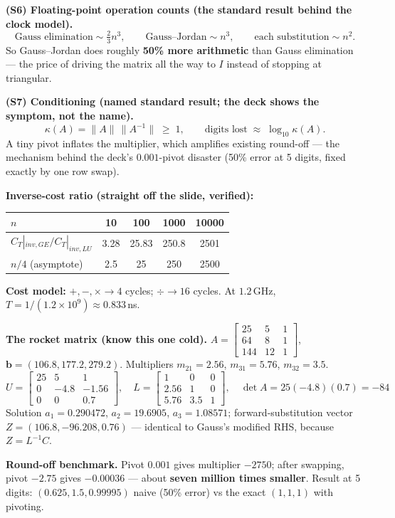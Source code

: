 \begin{derivedbox}
\smallskip
\textbf{(S6) Floating-point operation counts (the standard result behind the clock model).}
\[
\text{Gauss elimination} \sim \tfrac23 n^3, \qquad \text{Gauss--Jordan} \sim n^3, \qquad \text{each substitution} \sim n^2 .
\]
So Gauss--Jordan does roughly \textbf{50\% more arithmetic} than Gauss elimination --- the price of driving the matrix all the way to $I$ instead of stopping at triangular.

\smallskip
\textbf{(S7) Conditioning (named standard result; the deck shows the symptom, not the name).}
\[
\kappa(A) = \|A\|\,\|A^{-1}\| \;\ge\; 1, \qquad \text{digits lost} \;\approx\; \log_{10}\kappa(A).
\]
A tiny pivot inflates the multiplier, which amplifies existing round-off --- the mechanism behind the deck's $0.001$-pivot disaster (50\% error at 5 digits, fixed exactly by one row swap).
\end{derivedbox}

\begin{numbox}
\textbf{Inverse-cost ratio (straight off the slide, verified):}
\begin{center}\small
\begin{tabular}{@{}lcccc@{}}
\toprule
$n$ & 10 & 100 & 1000 & 10000\\
\midrule
$C_T|_{inv,GE} / C_T|_{inv,LU}$ & 3.28 & 25.83 & 250.8 & 2501\\
$n/4$ (asymptote) & 2.5 & 25 & 250 & 2500\\
\bottomrule
\end{tabular}
\end{center}

\textbf{Cost model:} $+,-,\times \to 4$ cycles; $\div \to 16$ cycles. At $1.2$\,GHz, $T = 1/(1.2\times10^9) \approx 0.833$\,ns.

\smallskip
\textbf{The rocket matrix (know this one cold).}
$A=\begin{bmatrix}25&5&1\\64&8&1\\144&12&1\end{bmatrix}$, $\mathbf b = (106.8, 177.2, 279.2)$.
Multipliers $m_{21}=2.56$, $m_{31}=5.76$, $m_{32}=3.5$.
\[
U=\begin{bmatrix}25&5&1\\0&-4.8&-1.56\\0&0&0.7\end{bmatrix},\quad
L=\begin{bmatrix}1&0&0\\2.56&1&0\\5.76&3.5&1\end{bmatrix},\quad
\det A = 25(-4.8)(0.7) = -84
\]
Solution $a_1 = 0.290472$, $a_2 = 19.6905$, $a_3 = 1.08571$; forward-substitution vector $Z = (106.8, -96.208, 0.76)$ --- identical to Gauss's modified RHS, because $Z = L^{-1}C$.

\smallskip
\textbf{Round-off benchmark.} Pivot $0.001$ gives multiplier $-2750$; after swapping, pivot $-2.75$ gives $-0.00036$ --- about \textbf{seven million times smaller}. Result at 5 digits: $(0.625, 1.5, 0.99995)$ naive (50\% error) vs the exact $(1,1,1)$ with pivoting.
\end{numbox}


